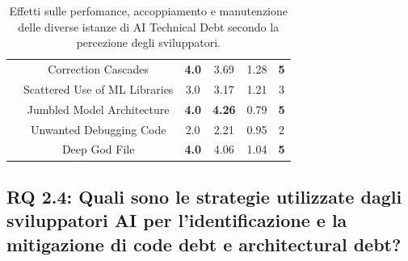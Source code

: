 \begin{table}[h!]
\begin{tabular}{|l|c|c|c|c|c|}
& Correction Cascades & \textbf{4.0} & 3.69 & 1.28 & \textbf{5}  \\
& Scattered Use of ML Libraries & 3.0 & 3.17 & 1.21 & 3  \\
& Jumbled Model Architecture & \textbf{4.0} & \textbf{4.26} & 0.79 & \textbf{5}  \\
& Unwanted Debugging Code & 2.0 & 2.21 & 0.95 & 2  \\
& Deep God File &\textbf{4.0} & 4.06 & 1.04 & \textbf{5}  \\
    \hline
    \end{tabular}
    \caption{Effetti sulle perfomance, accoppiamento e manutenzione delle diverse istanze di AI Technical Debt secondo la percezione degli sviluppatori.}
    \label{tab:impact_pt2}
\end{table}


\subsection{RQ 2.4: Quali sono le strategie utilizzate dagli sviluppatori AI per l’identificazione e la mitigazione di code debt e architectural debt?}

